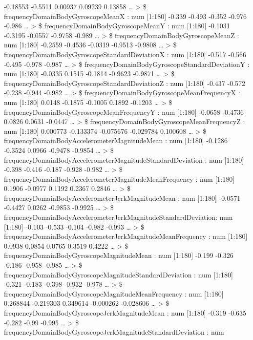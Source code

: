 \documentclass[
]{article}
\begin{document}
-0.18553 -0.5511 0.00937 0.09239 0.13858 \ldots{} \textgreater{} \$
frequencyDomainBodyGyroscopeMeanX : num {[}1:180{]} -0.339 -0.493 -0.352
-0.976 -0.986 \ldots{} \textgreater{} \$
frequencyDomainBodyGyroscopeMeanY : num {[}1:180{]} -0.1031 -0.3195
-0.0557 -0.9758 -0.989 \ldots{} \textgreater{} \$
frequencyDomainBodyGyroscopeMeanZ : num {[}1:180{]} -0.2559 -0.4536
-0.0319 -0.9513 -0.9808 \ldots{} \textgreater{} \$
frequencyDomainBodyGyroscopeStandardDeviationX : num {[}1:180{]} -0.517
-0.566 -0.495 -0.978 -0.987 \ldots{} \textgreater{} \$
frequencyDomainBodyGyroscopeStandardDeviationY : num {[}1:180{]} -0.0335
0.1515 -0.1814 -0.9623 -0.9871 \ldots{} \textgreater{} \$
frequencyDomainBodyGyroscopeStandardDeviationZ : num {[}1:180{]} -0.437
-0.572 -0.238 -0.944 -0.982 \ldots{} \textgreater{} \$
frequencyDomainBodyGyroscopeMeanFrequencyX : num {[}1:180{]} 0.0148
-0.1875 -0.1005 0.1892 -0.1203 \ldots{} \textgreater{} \$
frequencyDomainBodyGyroscopeMeanFrequencyY : num {[}1:180{]} -0.0658
-0.4736 0.0826 0.0631 -0.0447 \ldots{} \textgreater{} \$
frequencyDomainBodyGyroscopeMeanFrequencyZ : num {[}1:180{]} 0.000773
-0.133374 -0.075676 -0.029784 0.100608 \ldots{} \textgreater{} \$
frequencyDomainBodyAccelerometerMagnitudeMean : num {[}1:180{]} -0.1286
-0.3524 0.0966 -0.9478 -0.9854 \ldots{} \textgreater{} \$
frequencyDomainBodyAccelerometerMagnitudeStandardDeviation : num
{[}1:180{]} -0.398 -0.416 -0.187 -0.928 -0.982 \ldots{} \textgreater{}
\$ frequencyDomainBodyAccelerometerMagnitudeMeanFrequency : num
{[}1:180{]} 0.1906 -0.0977 0.1192 0.2367 0.2846 \ldots{} \textgreater{}
\$ frequencyDomainBodyAccelerometerJerkMagnitudeMean : num {[}1:180{]}
-0.0571 -0.4427 0.0262 -0.9853 -0.9925 \ldots{} \textgreater{} \$
frequencyDomainBodyAccelerometerJerkMagnitudeStandardDeviation: num
{[}1:180{]} -0.103 -0.533 -0.104 -0.982 -0.993 \ldots{} \textgreater{}
\$ frequencyDomainBodyAccelerometerJerkMagnitudeMeanFrequency : num
{[}1:180{]} 0.0938 0.0854 0.0765 0.3519 0.4222 \ldots{} \textgreater{}
\$ frequencyDomainBodyGyroscopeMagnitudeMean : num {[}1:180{]} -0.199
-0.326 -0.186 -0.958 -0.985 \ldots{} \textgreater{} \$
frequencyDomainBodyGyroscopeMagnitudeStandardDeviation : num {[}1:180{]}
-0.321 -0.183 -0.398 -0.932 -0.978 \ldots{} \textgreater{} \$
frequencyDomainBodyGyroscopeMagnitudeMeanFrequency : num {[}1:180{]}
0.268844 -0.219303 0.349614 -0.000262 -0.028606 \ldots{} \textgreater{}
\$ frequencyDomainBodyGyroscopeJerkMagnitudeMean : num {[}1:180{]}
-0.319 -0.635 -0.282 -0.99 -0.995 \ldots{} \textgreater{} \$
frequencyDomainBodyGyroscopeJerkMagnitudeStandardDeviation : num
\end{document}
